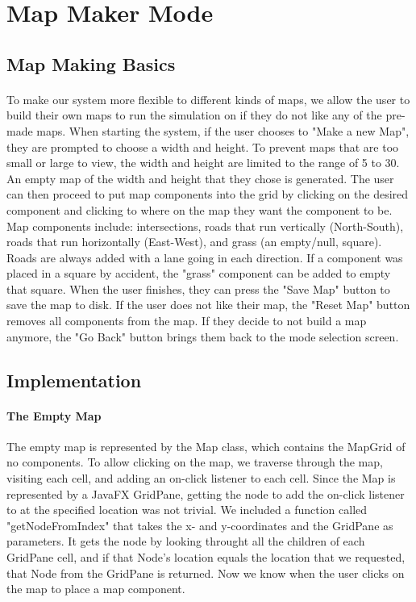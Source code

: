 \documentclass[a4paper,11pt,titlepage]{article}
\begin{document}
\section{Map Maker Mode}
\subsection{Map Making Basics}
\paragraph{}
To make our system more flexible to different kinds of maps, we allow the user to build their own maps to run the simulation on if they do not like any of the pre-made maps. When starting the system, if the user chooses to "Make a new Map", they are prompted to choose a width and height. To prevent maps that are too small or large to view, the width and height are limited to the range of 5 to 30. An empty map of the width and height that they chose is generated. The user can then proceed to put map components into the grid by clicking on the desired component and clicking to where on the map they want the component to be. Map components include: intersections, roads that run vertically (North-South), roads that run horizontally (East-West), and grass (an empty/null, square). Roads are always added with a lane going in each direction. If a component was placed in a square by accident, the "grass" component can be added to empty that square. When the user finishes, they can press the "Save Map" button to save the map to disk. If the user does not like their map, the "Reset Map" button removes all components from the map. If they decide to not build a map anymore, the "Go Back" button brings them back to the mode selection screen. 

\subsection{Implementation}
\paragraph{The Empty Map}
The empty map is represented by the Map class, which contains the MapGrid of no components. To allow clicking on the map, we traverse through the map, visiting each cell, and adding an on-click listener to each cell. Since the Map is represented by a JavaFX GridPane, getting the node to add the on-click listener to at the specified location was not trivial. We included a function called "getNodeFromIndex" that takes the x- and y-coordinates and the GridPane as parameters. It gets the node by looking throught all the children of each GridPane cell, and if that Node's location equals the location that we requested, that Node from the GridPane is returned. Now we know when the user clicks on the map to place a map component.
\end{document}

